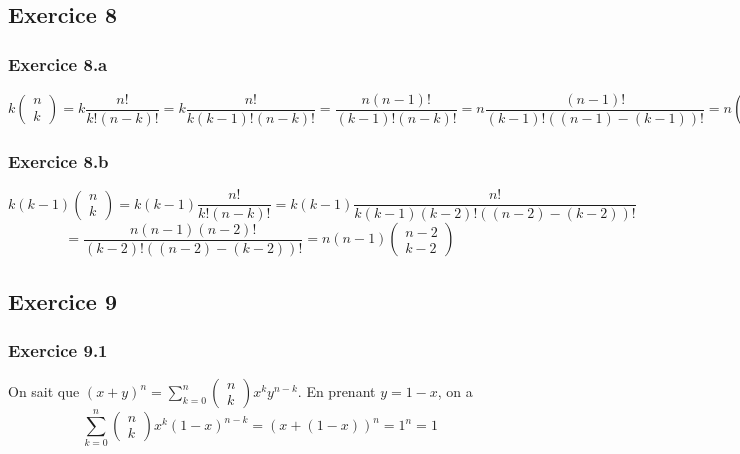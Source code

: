 \documentclass[]{book}
\theoremstyle{definition}
\begin{document}
\subsection*{Exercice 8}
\subsubsection*{Exercice 8.a}
$$k\begin{pmatrix}n\\k\end{pmatrix} = k\frac{n!}{k!(n-k)!} = k\frac{n!}{k(k-1)!(n-k)!}= \frac{n(n-1)!}{(k-1)!(n-k)!} = n\frac{(n-1)!}{(k-1)!((n-1)-(k-1))!}
= n \begin{pmatrix}n-1\\k-1\end{pmatrix}$$

\subsubsection*{Exercice 8.b}
$$k(k-1)\begin{pmatrix}n\\k\end{pmatrix} = k(k-1)\frac{n!}{k!(n-k)!} = k(k-1)\frac{n!}{k(k-1)(k-2)!((n-2)-(k-2))!} $$
$$= \frac{n(n-1)(n-2)!}{(k-2)!((n-2)-(k-2))!} = n(n-1)\begin{pmatrix}n-2\\k-2\end{pmatrix}$$

\subsection*{Exercice 9}
\subsubsection*{Exercice 9.1}
On sait que $(x+y)^n = \sum_{k=0}^{n}{\begin{pmatrix}n\\k\end{pmatrix}x^ky^{n-k}}$. En prenant $y = 1-x$, on a
$$\sum_{k=0}^{n}{\begin{pmatrix}n\\k\end{pmatrix}x^k(1-x)^{n-k}} = (x+(1-x))^n = 1^n = 1$$
\end{document}
